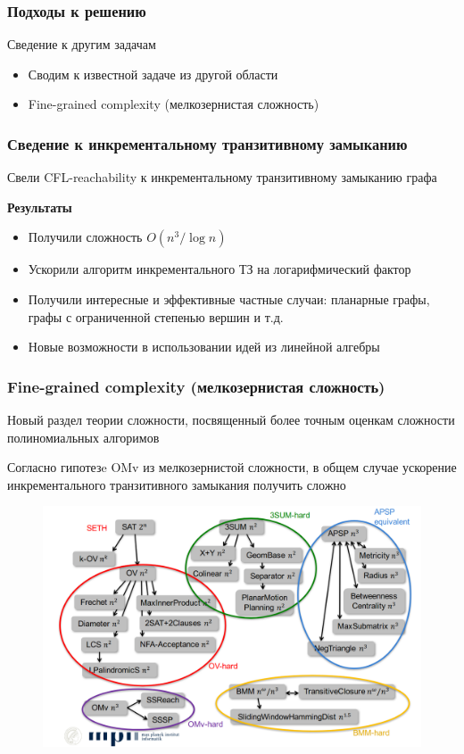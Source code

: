 \documentclass{beamer}
\begin{document}
\begin{frame}
\frametitle{Подходы к решению}

Сведение к другим задачам
\begin{itemize}
\item Сводим к известной задаче из другой области
\item Fine-grained complexity (мелкозернистая сложность)
\end{itemize}
\end{frame}

\begin{frame}
\frametitle{Сведение к инкрементальному транзитивному замыканию}
Свели CFL-reachability к инкрементальному транзитивному замыканию графа


\textbf{Результаты}
\begin{itemize}
\item Получили сложность $O(n^3/\log n)$
\item Ускорили алгоритм инкрементального ТЗ на логарифмический фактор
\item Получили интересные и эффективные частные случаи: планарные графы, графы с ограниченной степенью вершин и т.д.
\item Новые возможности в использовании идей из линейной алгебры
\end{itemize}
\end{frame}

\begin{frame}
\frametitle{Fine-grained complexity (мелкозернистая сложность)}
Новый раздел теории сложности, посвященный более точным оценкам сложности полиномиальных алгоримов


Согласно гипотезe OMv из мелкозернистой сложности, в общем случае ускорение инкрементального транзитивного замыкания получить сложно
\begin{figure}
\includegraphics[scale=0.2]{pictures/hierarhy.png}
\end{figure}
\end{frame}
\end{document}
